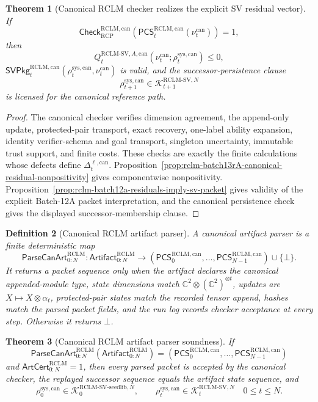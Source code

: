 \documentclass[11pt,a4paper]{article}
\newtheorem{theorem}{Theorem}[section]
\newtheorem{definition}[theorem]{Definition}
\newcommand{\Kcal}{\mathcal K}
\newcommand{\RCP}{\mathrm{RCP}}
\newcommand{\RCLM}{\mathrm{RCLM}}
\newcommand{\sys}{\mathrm{sys}}
\begin{document}
\begin{theorem}[Canonical RCLM checker realizes the explicit SV residual vector]
\label{thm:rclm-batch13rA-checker-realizes-explicit-residuals}
If
\[
\mathsf{Check}_{\RCP}^{\RCLM,\mathrm{can}}(\mathsf{PCS}_t^{\RCLM,\mathrm{can}}(\nu_t^{\mathrm{can}}))=1,
\]
then
\[
Q_t^{\RCLM\text{-}\mathrm{SV},A,\mathrm{can}}(\nu_t^{\mathrm{can}};\rho_t^{\sys,\mathrm{can}})\le0,
\]
\(\mathsf{SVPkg}_t^{\RCLM,\mathrm{can}}(\rho_t^{\sys,\mathrm{can}},\nu_t^{\mathrm{can}})\) is valid, and the successor-persistence clause
\[
\rho_{t+1}^{\sys,\mathrm{can}}
\in
\Kcal_{t+1}^{\RCLM\text{-}\mathrm{SV},N}
\]
is licensed for the canonical reference path.
\end{theorem}

\begin{proof}
The canonical checker verifies dimension agreement, the append-only update, protected-pair transport, exact recovery, one-label ability expansion, identity verifier-schema and goal transport, singleton uncertainty, immutable trust support, and finite costs.  These checks are exactly the finite calculations whose defects define \(\Delta_t^{\ell,\mathrm{can}}\).  Proposition~\ref{prop:rclm-batch13rA-canonical-residual-nonpositivity} gives componentwise nonpositivity.  Proposition~\ref{prop:rclm-batch12a-residuals-imply-sv-packet} gives validity of the explicit Batch-12A packet interpretation, and the canonical persistence check gives the displayed successor-membership clause.
\end{proof}

\begin{definition}[Canonical RCLM artifact parser]
\label{def:rclm-batch13rA-canonical-artifact-parser}
A canonical artifact parser is a finite deterministic map
\[
\mathsf{ParseCanArt}_{0:N}^{\RCLM}:
\mathsf{Artifact}_{0:N}^{\RCLM}
\longrightarrow
(\mathsf{PCS}_0^{\RCLM,\mathrm{can}},\ldots,\mathsf{PCS}_{N-1}^{\RCLM,\mathrm{can}})\cup\{\bot\}.
\]
It returns a packet sequence only when the artifact declares the canonical appended-module type, state dimensions match \(\mathbb C^2\otimes(\mathbb C^2)^{\otimes t}\), updates are \(X\mapsto X\otimes\alpha_t\), protected-pair states match the recorded tensor append, hashes match the parsed packet fields, and the run log records checker acceptance at every step. Otherwise it returns \(\bot\).
\end{definition}

\begin{theorem}[Canonical RCLM artifact parser soundness]
\label{thm:rclm-batch13rA-artifact-parser-soundness}
If
\[
\mathsf{ParseCanArt}_{0:N}^{\RCLM}(\mathsf{Artifact}_{0:N}^{\RCLM})
=
(\mathsf{PCS}_0^{\RCLM,\mathrm{can}},\ldots,\mathsf{PCS}_{N-1}^{\RCLM,\mathrm{can}})
\]
and \(\mathsf{ArtCert}_{0:N}^{\RCLM}=1\), then every parsed packet is accepted by the canonical checker, the replayed successor sequence equals the artifact state sequence, and
\[
\rho_0^{\sys,\mathrm{can}}
\in
\Kcal_0^{\RCLM\text{-}\mathrm{SV\mbox{-}seedlib},N},
\qquad
\rho_t^{\sys,\mathrm{can}}
\in
\Kcal_t^{\RCLM\text{-}\mathrm{SV},N}
\quad 0\le t\le N.
\]
\end{theorem}
\end{document}
